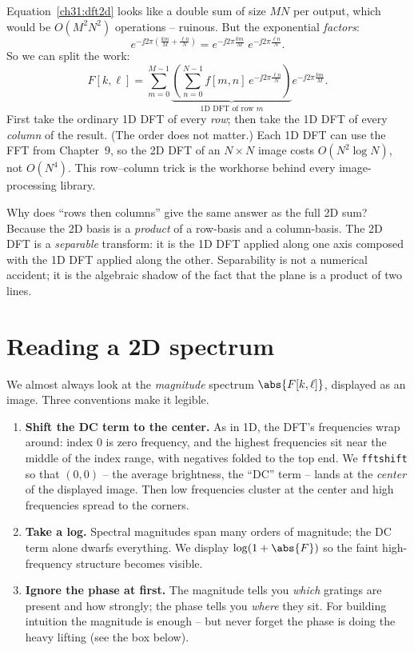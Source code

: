 Equation~\eqref{ch31:dft2d} looks like a double sum of size $MN$ per output, which
would be $O(M^2N^2)$ operations -- ruinous. But the exponential \emph{factors}:
\[
e^{-\jj 2\pi(\frac{km}{M}+\frac{\ell n}{N})}
= e^{-\jj 2\pi \frac{km}{M}}\; e^{-\jj 2\pi \frac{\ell n}{N}}.
\]
So we can split the work:
\begin{equation}
F[k,\ell] = \sum_{m=0}^{M-1}\underbrace{\left(\sum_{n=0}^{N-1}
f[m,n]\,e^{-\jj 2\pi \frac{\ell n}{N}}\right)}_{\text{1D DFT of row } m}
e^{-\jj 2\pi \frac{km}{M}}.
\label{ch31:rowcol}
\end{equation}
First take the ordinary 1D DFT of every \emph{row}; then take the 1D DFT of every
\emph{column} of the result. (The order does not matter.) Each 1D DFT can use the
FFT from Chapter~9, so the 2D DFT of an $N\times N$ image costs $O(N^2\log N)$, not
$O(N^4)$. This row--column trick is the workhorse behind every image-processing
library.

\begin{whybox}
Why does ``rows then columns'' give the same answer as the full 2D sum? Because the
2D basis is a \emph{product} of a row-basis and a column-basis. The 2D DFT is a
\emph{separable} transform: it is the 1D DFT applied along one axis composed with
the 1D DFT applied along the other. Separability is not a numerical accident; it is
the algebraic shadow of the fact that the plane is a product of two lines.
\end{whybox}

\section{Reading a 2D spectrum}
\label{ch31:reading}

We almost always look at the \emph{magnitude} spectrum $\abs{F[k,\ell]}$, displayed
as an image. Three conventions make it legible.

\begin{enumerate}
\item \textbf{Shift the DC term to the center.} As in 1D, the DFT's frequencies
wrap around: index $0$ is zero frequency, and the highest frequencies sit near the
middle of the index range, with negatives folded to the top end. We
\texttt{fftshift} so that $(0,0)$ -- the average brightness, the ``DC'' term --
lands at the \emph{center} of the displayed image. Then low frequencies cluster at
the center and high frequencies spread to the corners.
\item \textbf{Take a log.} Spectral magnitudes span many orders of magnitude; the
DC term alone dwarfs everything. We display $\log(1+\abs{F})$ so the faint
high-frequency structure becomes visible.
\item \textbf{Ignore the phase at first.} The magnitude tells you \emph{which}
gratings are present and how strongly; the phase tells you \emph{where} they sit.
For building intuition the magnitude is enough -- but never forget the phase is
doing the heavy lifting (see the box below).
\end{enumerate}

